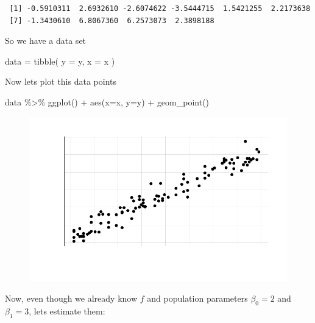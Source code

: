\documentclass[
  letterpaper,
  DIV=11,
  numbers=noendperiod]{scrreprt}
\newenvironment{Shaded}{\begin{snugshade}}{\end{snugshade}}
\newcommand{\AttributeTok}[1]{\textcolor[rgb]{0.65,0.35,0.00}{#1}}
\newcommand{\FunctionTok}[1]{\textcolor[rgb]{0.02,0.16,0.49}{#1}}
\newcommand{\NormalTok}[1]{\textcolor[rgb]{0.33,0.33,0.33}{#1}}
\newcommand{\OtherTok}[1]{\textcolor[rgb]{0.85,0.12,0.09}{#1}}
\newcommand{\SpecialCharTok}[1]{\textcolor[rgb]{0.00,0.46,0.62}{#1}}
\begin{document}
\begin{verbatim}
 [1] -0.5910311  2.6932610 -2.6074622 -3.5444715  1.5421255  2.2173638
 [7] -1.3430610  6.8067360  6.2573073  2.3898188
\end{verbatim}

So we have a data set

\begin{Shaded}
\begin{Highlighting}[]
\NormalTok{data }\OtherTok{=} \FunctionTok{tibble}\NormalTok{(}
  \AttributeTok{y =}\NormalTok{ y, }\AttributeTok{x =}\NormalTok{ x}
\NormalTok{)}
\end{Highlighting}
\end{Shaded}

Now lets plot this data points

\begin{Shaded}
\begin{Highlighting}[]
\NormalTok{data }\SpecialCharTok{\%\textgreater{}\%} 
  \FunctionTok{ggplot}\NormalTok{() }\SpecialCharTok{+} \FunctionTok{aes}\NormalTok{(}\AttributeTok{x=}\NormalTok{x, }\AttributeTok{y=}\NormalTok{y) }\SpecialCharTok{+} \FunctionTok{geom\_point}\NormalTok{() }
\end{Highlighting}
\end{Shaded}

\begin{figure}[H]

{\centering \includegraphics{Chapter3_files/figure-pdf/unnamed-chunk-13-1.pdf}

}

\end{figure}

Now, even though we already know \(f\) and population parameters
\(\beta_0 = 2\) and \(\beta_1 = 3\), lets estimate them:
\end{document}
